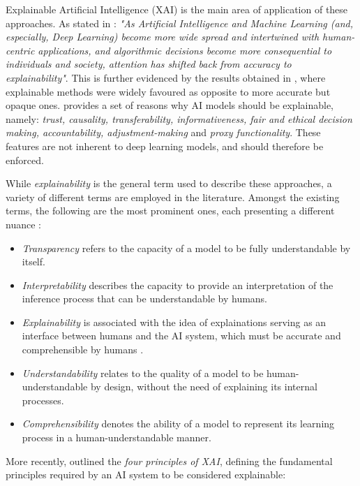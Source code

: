 Explainable Artificial Intelligence (XAI) is the main area of application of these approaches. As stated in \cite{angelov_explainable_2021}: \textit{"As Artificial Intelligence and Machine Learning (and, especially, Deep Learning) become more wide spread and intertwined with human-centric applications, and algorithmic decisions become more consequential to individuals and society, attention has shifted back from accuracy to explainability"}. This is further evidenced by the results obtained in \cite{amador_systematic_review_2019}, where explainable methods were widely favoured as opposite to more accurate but opaque ones. \cite{burkart_survey_2021} provides a set of reasons why AI models should be explainable, namely: \textit{trust, causality, transferability, informativeness, fair and ethical decision making, accountability, adjustment-making} and \textit{proxy functionality}. These features are not inherent to deep learning models, and should therefore be enforced.

While \textit{explainability} is the general term used to describe these approaches, a variety of different terms are employed in the literature. Amongst the existing terms, the following are the most prominent ones, each presenting a different nuance \citep{barredo_arrieta_explainable_2020,adadi_explainability_2018,gilpin_explainability_2018}:
\begin{itemize}
    \item \textit{Transparency} refers to the capacity of a model to be fully understandable by itself.
    \item \textit{Interpretability} describes the capacity to provide an interpretation of the inference process that can be understandable by humans. 
    \item \textit{Explainability} is associated with the idea of explainations serving as an interface between humans and the AI system, which must be accurate and comprehensible by humans \citep{guidotti_explainability_2018}.
    \item \textit{Understandability} relates to the quality of a model to be human-understandable by design, without the need of explaining its internal processes.
    \item \textit{Comprehensibility} denotes the ability of a model to represent its learning process in a human-understandable manner.
\end{itemize}

More recently, \cite{phillips_explainability_2021} outlined the \textit{four principles of XAI}, defining the fundamental principles required by an AI system to be considered explainable:

